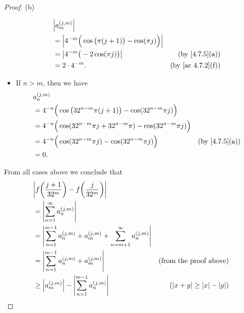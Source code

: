 \begin{proof}{(b)}
\begin{itemize}
          \begin{align*}
             & \abs{a_m^{(j, m)}}                                                                                \\
             & = \abs{4^{-m} \Big(\cos\big(\pi (j + 1)\big) - \cos(\pi j)\Big)}                                  \\
             & = \abs{4^{-m} \big(-2 \cos(\pi j)\big)}                          & \text{(by \cref{4.7.5}(a))}    \\
             & = 2 \cdot 4^{-m}.                                                & \text{(by \cref{ac 4.7.2}(f))}
          \end{align*}
    \item If \(n > m\), then we have
          \begin{align*}
             & a_n^{(j, m)}                                                                                                      \\
             & = 4^{-n} \Big(\cos\big(32^{n - m} \pi (j + 1)\big) - \cos(32^{n - m} \pi j)\Big)                                  \\
             & = 4^{-n} \Big(\cos(32^{n - m} \pi j + 32^{n - m} \pi) - \cos(32^{n - m} \pi j)\Big)                               \\
             & = 4^{-n} \Big(\cos(32^{n - m} \pi j) - \cos(32^{n - m} \pi j)\Big)                  & \text{(by \cref{4.7.5}(a))} \\
             & = 0.
          \end{align*}
  \end{itemize}
  From all cases above we conclude that
  \begin{align*}
     & \abs{f\bigg(\frac{j + 1}{32^m}\bigg) - f\bigg(\frac{j}{32^m}\bigg)}                                                                    \\
     & = \abs{\sum_{n = 1}^\infty a_n^{(j, m)}}                                                                                               \\
     & = \abs{\sum_{n = 1}^{m - 1} a_n^{(j, m)} + a_m^{(j, m)} + \sum_{n = m + 1}^\infty a_n^{(j, m)}}                                        \\
     & = \abs{\sum_{n = 1}^{m - 1} a_n^{(j, m)} + a_m^{(j, m)}}                                        & \text{(from the proof above)}        \\
     & \geq \abs{a_m^{(j, m)}} - \abs{\sum_{n = 1}^{m - 1} a_n^{(j, m)}}                               & (\abs{x + y} \geq \abs{x} - \abs{y}) \\

\end{align*}
\end{proof}
